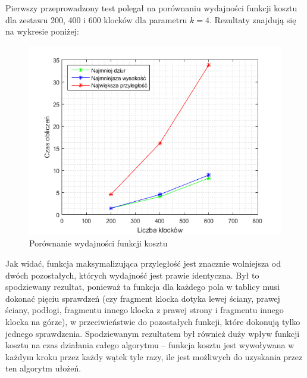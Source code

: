\documentclass{article}
\begin{document}
Pierwszy przeprowadzony test polegał na porównaniu wydajności funkcji kosztu dla zestawu 200, 400 i 600 klocków dla parametru $k = 4$. Rezultaty znajdują się na wykresie poniżej:
\begin{figure}[H]
\includegraphics[width=\textwidth]{wydajnosc_porownanie_funkcji.png}
\caption{Porównanie wydajności funkcji kosztu}
\end{figure}
Jak widać, funkcja maksymalizująca przyległość jest znacznie wolniejsza od dwóch pozostałych, których wydajność jest prawie identyczna. Był to spodziewany rezultat, ponieważ ta funkcja dla każdego pola w tablicy musi dokonać pięciu sprawdzeń (czy fragment klocka dotyka lewej ściany, prawej ściany, podłogi, fragmentu innego klocka z prawej strony i fragmentu innego klocka na górze), w przeciwieństwie do pozostałych funkcji, które dokonują tylko jednego sprawdzenia. Spodziewanym rezultatem był również duży wpływ funkcji kosztu na czas działania całego algorytmu -- funkcja kosztu jest wywoływana w każdym kroku przez każdy wątek tyle razy, ile jest możliwych do uzyskania przez ten algorytm ułożeń.
\end{document}
